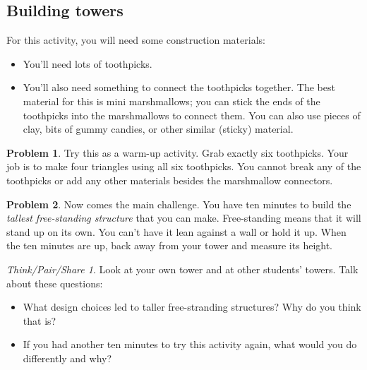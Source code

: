 \documentclass[12pt, reqno]{amsart}
\theoremstyle{remark}
\newtheorem*{thinkpair*}{Think/Pair/Share}
\theoremstyle{definition}
\newtheorem{problem}{Problem}
\numberwithin{equation}{section}  %
\begin{document}
\newpage





\subsection{Building towers}
For this activity, you will need some construction materials:
\begin{itemize}
\item
You'll need lots of toothpicks.\\

\item
You'll also need something to connect the toothpicks together.  The best material for this is mini marshmallows; you can stick the ends of the toothpicks into the marshmallows to connect them.  You can also use pieces of clay, bits of gummy candies, or other similar (sticky) material.\\
\end{itemize}

\bigskip

\begin{problem}
Try this as a warm-up activity.  Grab exactly six toothpicks.  Your job is to make four triangles using all six toothpicks.  You cannot break any of the toothpicks or add any other materials besides the marshmallow connectors.
\end{problem}

\bigskip

\begin{problem}
Now comes the main challenge.  You have ten minutes to build the \emph{tallest free-standing structure} that you can make.  
Free-standing means that it will stand up on its own.  You can't have it lean against a wall or hold it up.  When the ten minutes are up, back away from your tower and measure its height.  
\end{problem}

\bigskip
\bigskip

\begin{thinkpair*}
Look at your own tower and at other students' towers.  Talk about these questions: 
\begin{itemize}
\item
What design choices led to taller free-stranding structures?  Why do you think that is?\\
\item
If you had another ten minutes to try this activity again, what would you do differently and why?\\
\end{itemize}

\end{thinkpair*}
\end{document}
